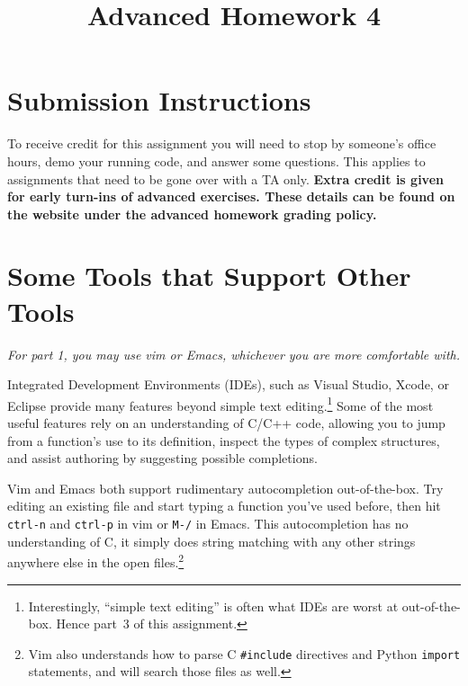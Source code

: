 \documentclass{article}
\begin{document}
\fancyfoot[C]{\color{gray} \thepage~/~\pageref*{LastPage}}
\pagestyle{fancyplain}

\title{\textbf{Advanced Homework 4\\}}
\author{\textbf{\color{red}{Due: Wednesday, October 11th, 11:59PM (Hard Deadline)}}}
\date{}
\maketitle


\section*{Submission Instructions}
To receive credit for this assignment you will need to stop by someone's
office hours, demo your running code, and answer some questions. \textbf{\color{red}{Make sure
to check the office hour schedule as the real due date is at the last office
hours before the date listed above.}} This applies to assignments that need to be gone over with a TA only.
\textbf{Extra credit is given for early turn-ins of advanced exercises. These details can be found on the website under the advanced homework grading policy.}

\medskip
\noindent
\section{Some Tools that Support Other Tools}
\emph{For part 1, you may use vim or Emacs, whichever you are more comfortable
  with.}

Integrated Development Environments (IDEs), such as Visual Studio, Xcode, or
Eclipse provide many features beyond simple text editing.\footnote{
  Interestingly, ``simple text editing'' is often what IDEs are worst at
  out-of-the-box. Hence part~3 of this assignment.
}
Some of the most useful features rely on an understanding of C/C++ code,
allowing you to jump from a function's use to its definition, inspect the types
of complex structures, and assist authoring by suggesting possible
completions.

Vim and Emacs both support rudimentary autocompletion out-of-the-box. Try
editing an existing file and start typing a function you've used before, then
hit \texttt{ctrl-n} and \texttt{ctrl-p} in vim or \texttt{M-/} in Emacs. This
autocompletion has no understanding of C, it simply does string matching with
any other strings anywhere else in the open files.\footnote{
  Vim also understands how to parse C \texttt{\#include} directives and Python
  \texttt{import} statements, and will search those files as well.
}
\end{document}
